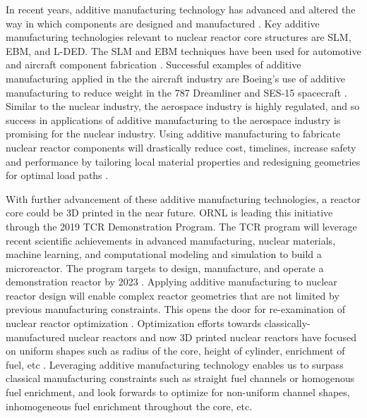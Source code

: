 In recent years, additive manufacturing technology has advanced and  
altered the way in which components are designed and manufactured 
\cite{simpson_considerations_2019}. 
Key additive manufacturing technologies relevant to nuclear reactor core 
structures are \gls{SLM}, \gls{EBM}, and \gls{L-DED}. 
The \gls{SLM} and \gls{EBM} techniques have been used for automotive and aircraft component 
fabrication \cite{murr_frontiers_2016}.  
Successful examples of additive manufacturing applied in the the aircraft industry 
are Boeing’s use of additive manufacturing to reduce weight in the 787 Dreamliner
\cite{noauthor_printed_2017} and SES-15 spacecraft \cite{noauthor_boeing_nodate}. 
Similar to the nuclear industry, the aerospace industry is highly regulated, and 
so success in applications of additive manufacturing to the aerospace industry 
is promising for the nuclear industry.  
Using additive manufacturing to fabricate nuclear reactor components will 
drastically reduce cost, timelines, increase safety and performance by 
tailoring local material properties and redesigning geometries for optimal load paths 
\cite{simpson_considerations_2019}. 

With further advancement of these additive manufacturing technologies, a reactor 
core could be 3D printed in the near future. 
\gls{ORNL} is leading this initiative through the 2019 \gls{TCR} Demonstration 
Program. 
The \gls{TCR} program will leverage recent scientific achievements in advanced 
manufacturing, nuclear materials, machine learning, and computational modeling 
and simulation to build a microreactor. 
The program targets to design, manufacture, and operate a demonstration reactor 
by 2023 \cite{terrani_transformational_2019}. 
Applying additive manufacturing to nuclear reactor design will enable complex 
reactor geometries that are not limited by previous manufacturing constraints. 
This opens the door for re-examination of nuclear reactor optimization 
\cite{sobes_artificial_2020}. 
Optimization efforts towards classically-manufactured nuclear reactors and now
3D printed nuclear reactors have focused on uniform shapes such as radius of the 
core, height of cylinder, enrichment of fuel, etc 
\cite{sobes_artificial_2020,sacco_two_2006,kumar_new_2015,pereira_parallel_2008}. 
Leveraging additive manufacturing technology enables us to surpass classical 
manufacturing constraints such as straight fuel channels or homogenous fuel enrichment, 
and look forwards to optimize for non-uniform channel shapes, inhomogeneous 
fuel enrichment throughout the core, etc. 

